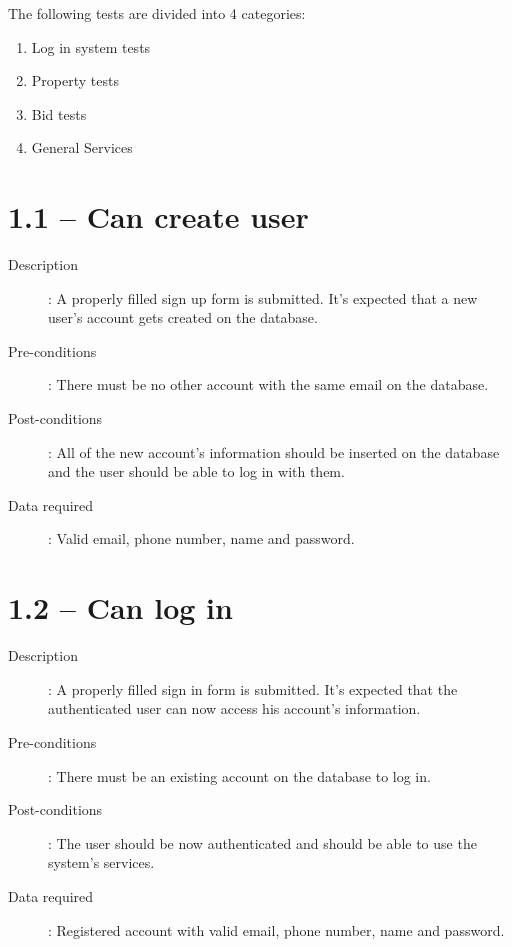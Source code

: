 The following tests are divided into 4 categories:
\begin{enumerate}
    \item Log in system tests
    \item Property tests
    \item Bid tests
    \item General Services
\end{enumerate}

\section*{1.1 – Can create user}
\begin{description}
    \item[Description]: A properly filled sign up form is submitted. It’s expected that a new user’s account gets created on the database.
    \item[Pre-conditions]: There must be no other account with the same email on the database.
    \item[Post-conditions]: All of the new account’s information should be inserted on the database and the user should be able to log in with them.
    \item[Data required]: Valid email, phone number, name and password.
\end{description}

\section*{1.2 – Can log in}
\begin{description}    
    \item[Description]: A properly filled sign in form is submitted. It’s expected that the authenticated user can now access his account’s information.
    \item[Pre-conditions]: There must be an existing account on the database to log in.
    \item[Post-conditions]: The user should be now authenticated and should be able to use the system’s services.
    \item[Data required]: Registered account with valid email, phone number, name and password.
\end{description}

